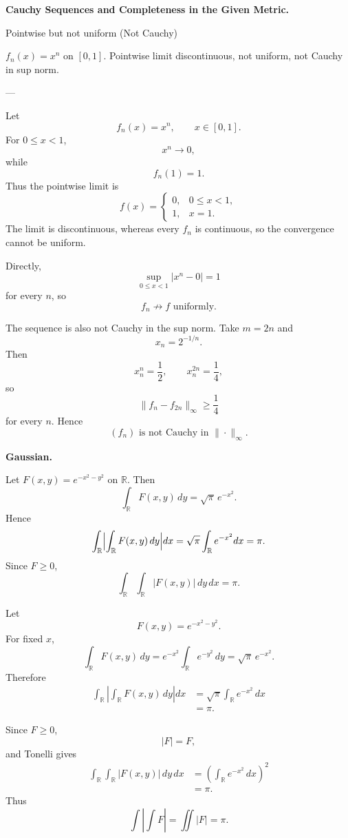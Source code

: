 \begin{problem}[CP-II-0408]
\label{prob:cp-ii-0408}
\textbf{Cauchy Sequences and Completeness in the Given Metric.}

\hspace*{1.5em}Pointwise but not uniform (Not Cauchy)

$f_n(x)=x^n$ on $[0,1]$.
Pointwise limit discontinuous, not uniform, not Cauchy in sup norm.

---
\end{problem}

\begin{solution}
Let
\[
f_n(x)=x^n,
\qquad
x\in[0,1].
\]
For \(0\le x<1\),
\[
x^n\to0,
\]
while
\[
f_n(1)=1.
\]
Thus the pointwise limit is
\[
f(x)
=
\begin{cases}
0,&0\le x<1,\\
1,&x=1.
\end{cases}
\]
The limit is discontinuous, whereas every \(f_n\) is continuous, so the convergence cannot be
uniform.

Directly,
\[
\sup_{0\le x<1}|x^n-0|=1
\]
for every \(n\), so
\[
\boxed{f_n\not\to f\text{ uniformly}.}
\]

The sequence is also not Cauchy in the sup norm. Take \(m=2n\) and
\[
x_n=2^{-1/n}.
\]
Then
\[
x_n^n=\frac12,
\qquad
x_n^{2n}=\frac14,
\]
so
\[
\|f_n-f_{2n}\|_\infty
\ge
\frac14
\]
for every \(n\). Hence
\[
\boxed{
(f_n)\text{ is not Cauchy in }\|\cdot\|_\infty.
}
\]
\end{solution}


\begin{problem}[CP-II-0409]
\label{prob:cp-ii-0409}
\textbf{Gaussian.}

\hspace*{1.5em}Let $F(x,y)=e^{-x^2-y^2}$ on $\mathbb{R}$.  Then
\[
\int_{\mathbb{R}}F(x,y)\,dy = \sqrt{\pi}\,e^{-x^2}.
\]
Hence
\[
\int_{\mathbb{R}} \Bigl|\int_{\mathbb{R}}F(x,y)\,dy\Bigr|dx
= \sqrt{\pi}\int_{\mathbb{R}} e^{-x^2}dx
= \pi.
\]
Since $F\ge 0$,
\[
\int_{\mathbb{R}}\int_{\mathbb{R}}|F(x,y)|\,dy\,dx
= \pi.
\]
\end{problem}

\begin{solution}
Let
\[
F(x,y)=e^{-x^2-y^2}.
\]
For fixed \(x\),
\[
\int_{\mathbb R}F(x,y)\,dy
=
e^{-x^2}
\int_{\mathbb R}e^{-y^2}\,dy
=
\sqrt\pi\,e^{-x^2}.
\]
Therefore
\[
\begin{aligned}
\int_{\mathbb R}
\left|
\int_{\mathbb R}F(x,y)\,dy
\right|dx
&=
\sqrt\pi
\int_{\mathbb R}e^{-x^2}\,dx\\
&=
\pi.
\end{aligned}
\]

Since \(F\ge0\),
\[
|F|=F,
\]
and Tonelli gives
\[
\begin{aligned}
\int_{\mathbb R}\int_{\mathbb R}|F(x,y)|\,dy\,dx
&=
\left(
\int_{\mathbb R}e^{-x^2}\,dx
\right)^2\\
&=
\pi.
\end{aligned}
\]
Thus
\[
\boxed{
\int\left|\int F\right|
=
\iint|F|
=
\pi.
}
\]
\end{solution}


